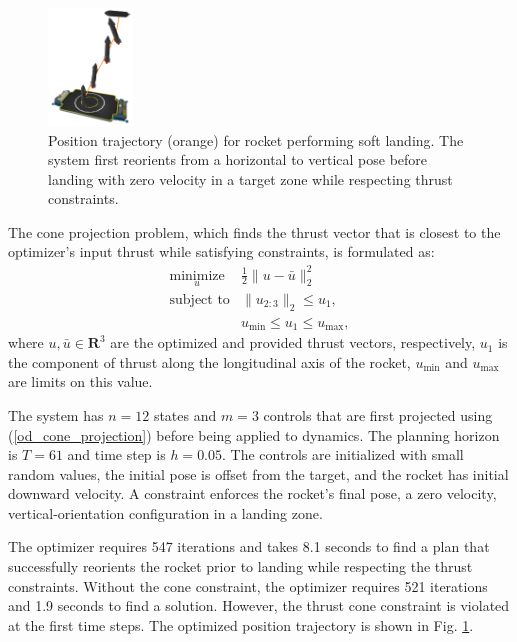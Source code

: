 \begin{figure}[H]
	\centering
	\includegraphics[width=0.2\textwidth]{optimization_dynamics/starship_ghost.png}
	\caption[Rocket belly-flop soft-landing plan]{Position trajectory (orange) for rocket performing soft landing. The system first reorients from a horizontal to vertical pose before landing with zero velocity in a target zone while respecting thrust constraints.}
	\label{od_rocket_ghost}
\end{figure}

The cone projection problem, which finds the thrust vector that is closest to the optimizer's input thrust while satisfying constraints, is formulated as:
\begin{equation}
	\begin{array}{ll}
		\underset{u}{\mbox{minimize}} & \frac{1}{2} \|u - \bar{u}\|_2^2 \\
		\mbox{subject to} & \|u_{2:3}\|_2 \leq u_1, \\
		& u_{\mbox{min}} \leq u_1 \leq u_{\mbox{max}},
	\end{array} \label{od_cone_projection}
\end{equation}
where $u, \bar{u} \in \mathbf{R}^3$ are the optimized and provided thrust vectors, respectively, $u_1$ is the component of thrust along the longitudinal axis of the rocket, $u_{\mbox{min}}$ and $u_{\mbox{max}}$ are limits on this value.

The system has $n = 12$ states and $m = 3$ controls that are first projected using (\ref{od_cone_projection}) before being applied to dynamics. The planning horizon is $T = 61$ and time step is $h = 0.05$. The controls are initialized with small random values, the initial pose is offset from the target, and the rocket has initial downward velocity. A constraint enforces the rocket's final pose, a zero velocity, vertical-orientation configuration in a landing zone.

The optimizer requires 547 iterations and takes 8.1 seconds to find a plan that successfully reorients the rocket prior to landing while respecting the thrust constraints. Without the cone constraint, the optimizer requires 521 iterations and 1.9 seconds to find a solution. However, the thrust cone constraint is violated at the first time steps. The optimized position trajectory is shown in Fig. \ref{od_rocket_ghost}.

